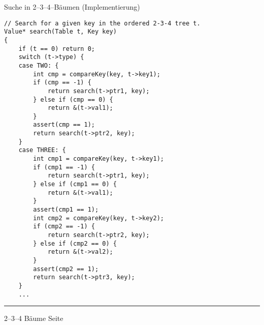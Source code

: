 \begin{slide}{}
\normalsize

\begin{center}
    Suche in 2--3--4--B\"aumen (Implementierung)
\end{center}
\vspace*{0.5cm}

\footnotesize
\begin{verbatim}
// Search for a given key in the ordered 2-3-4 tree t.
Value* search(Table t, Key key) 
{
    if (t == 0) return 0;
    switch (t->type) {
    case TWO: {
        int cmp = compareKey(key, t->key1);
        if (cmp == -1) {
            return search(t->ptr1, key);
        } else if (cmp == 0) {
            return &(t->val1);
        } 
        assert(cmp == 1);
        return search(t->ptr2, key);
    }
    case THREE: {
        int cmp1 = compareKey(key, t->key1);
        if (cmp1 == -1) {
            return search(t->ptr1, key);
        } else if (cmp1 == 0) {
            return &(t->val1);
        } 
        assert(cmp1 == 1);
        int cmp2 = compareKey(key, t->key2);
        if (cmp2 == -1) {
            return search(t->ptr2, key);
        } else if (cmp2 == 0) {
            return &(t->val2);
        }
        assert(cmp2 == 1);
        return search(t->ptr3, key);
    }
    ...
\end{verbatim}


\vspace*{\fill}
\tiny \addtocounter{mypage}{1}
\rule{17cm}{1mm}
2--3--4 B\"aume  \hspace*{\fill} Seite 
\end{slide}


